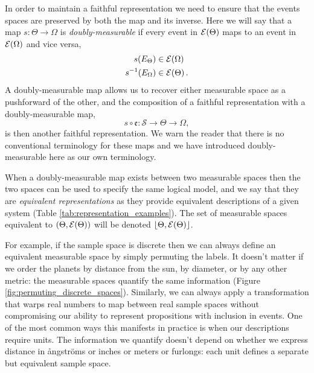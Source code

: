 In order to maintain a faithful representation we need to ensure that
the events spaces are preserved by both the map and its inverse.  Here
we will say that a map $s : \Theta \rightarrow \Omega$ is 
\emph{doubly-measurable} if every event in $ \mathcal{E} \! \left( \Theta \right) $ maps to an 
event in $ \mathcal{E} \! \left( \Omega \right) $ and vice versa,
%
\begin{align*}
s \! \left( E_{\Theta} \right) &\in  \mathcal{E} \! \left( \Omega \right) 
\\
s^{-1} \! \left( E_{\Omega} \right) &\in  \mathcal{E} \! \left( \Theta \right) .
\end{align*}
%
A doubly-measurable map allows us to recover either measurable space 
as a pushforward of the other, and the composition of a faithful 
representation with a doubly-measurable map,
%
\begin{equation*}
s \circ \mathfrak{e} : \mathcal{S} \rightarrow \Theta \rightarrow \Omega,
\end{equation*}
%
is then another faithful representation.  We warn the reader that there
is no conventional terminology for these maps and we have introduced
doubly-measurable here as our own terminology.

When a doubly-measurable map exists between two measurable spaces
then the two spaces can be used to specify the same logical model,
and we say that they are \emph{equivalent representations} as they provide
equivalent descriptions of a given system 
(Table \ref{tab:representation_examples}).  The set of measurable spaces
equivalent to $\left( \Theta,  \mathcal{E} \! \left( \Theta \right)  \right)$ will be denoted
$\lfloor \Theta,  \mathcal{E} \! \left( \Theta \right)  \rfloor$.

For example, if the sample space is discrete then we can always define 
an equivalent measurable space by simply permuting the labels.  It doesn't 
matter if we order the planets by distance from the sun, by diameter, or 
by any other metric: the measurable spaces quantify the same information 
(Figure \ref{fig:permuting_discrete_spaces}).   Similarly, we can always 
apply a transformation that warps real numbers to map between real 
sample spaces without compromising our ability to represent propositions 
with inclusion in events.  One of the most common ways this manifests in 
practice is when our descriptions require units.  The information we quantify 
doesn't depend on whether we express distance in {\aa}ngstr\"{o}ms or 
inches or meters or furlongs: each unit defines a separate but equivalent 
sample space.

